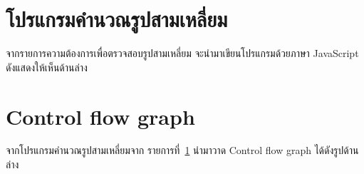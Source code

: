 \documentclass[12pt,a4paper]{article}
\renewcommand{\lstlistingname}{รายการที่}
\begin{document}
\section{โปรแกรมคำนวณรูปสามเหลี่ยม}
\label{listing:trianglecal}
จากรายการความต้องการเพื่อตรวจสอบรูปสามเหลี่ยม จะนำมาเขียนโปรแกรมด้วยภาษา JavaScript ดังแสดงให้เห็นด้านล่าง


\newpage
\section{Control flow graph}
จากโปรแกรมคำนวณรูปสามเหลี่ยมจาก \lstlistingname\, \ref{listing:trianglecal} นำมาวาด Control flow graph ได้ดังรูปด้านล่าง
\end{document}
